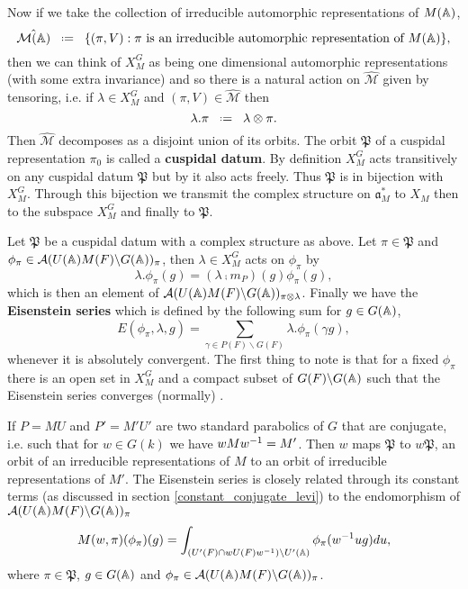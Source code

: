 Now if we take the collection of irreducible automorphic representations of \(M(\A)\),
 \[\hat{\mathcal{M}(\A)} \defeq \{(\pi, V) : \pi \text{ is an irreducible automorphic representation of }M(\A)\},\]
then we can think of \(X_M^G\) as being one dimensional automorphic representations (with some extra invariance) and so there is a natural action on \(\hat{\mathcal{M}}\) given by tensoring, i.e. if \(\lambda\in X_M^G\) and \((\pi, V)\in \hat{\mathcal{M}}\) then 
\[\lambda.\pi \defeq \lambda\tensor \pi.\]
Then \(\hat{\mathcal{M}}\) decomposes as a disjoint union of its orbits. The orbit \(\mathfrak{P}\) of a cuspidal representation \(\pi_0\) is called a \textbf{cuspidal datum}. By definition \(X_M^G\) acts transitively on any cuspidal datum \(\mathfrak{P}\) but by \cite[II.1]{moeglinSpectralDecompositionEisenstein1995} it also acts freely. Thus \(\mathfrak{P}\) is in bijection with \(X_M^G\). Through this bijection we transmit the complex structure on \(\mathfrak{a}_M^*\) to \(X_M\) then to the subspace \(X_M^G\) and finally to \(\mathfrak{P}\).

Let \(\mathfrak{P}\) be a cuspidal datum with a complex structure as above. Let \(\pi\in \mathfrak{P}\) and \(\phi_\pi \in \mathcal{A}(U(\A)M(F)\backslash G(\A))_\pi\), then \(\lambda\in X_M^G\) acts on \(\phi_\pi\) by 
\[\lambda.\phi_\pi(g) = (\lambda \comp m_P)(g) \phi_\pi(g),\]
which is then an element of \(\mathcal{A}(U(\A)M(F)\backslash G(\A))_{\pi\tensor \lambda}\). Finally we have the \textbf{Eisenstein series} which is defined by the following sum for \(g\in G(\A)\),
\[E(\phi_\pi, \lambda, g) = \sum_{\gamma \in P(F)\backslash G(F)} \lambda.\phi_\pi(\gamma g),\]
whenever it is absolutely convergent. The first thing to note is that for a fixed \(\phi_\pi\) there is an open set in \(X_M^G\) and a compact subset of \(G(F)\backslash G(\A)\) such that the Eisenstein series converges (normally) \cite[II.1.5]{moeglinSpectralDecompositionEisenstein1995}.

If \(P = MU\) and \(P' = M'U'\) are two standard parabolics of \(G\) that are conjugate, i.e. such that for \(w\in G(k)\) we have \(wMw^{-1} = M'\).
Then \(w\) maps \(\mathfrak{P}\) to \(w\mathfrak{P}\), an orbit of an irreducible representations of \(M\) to an orbit of irreducible representations of \(M'\).
The Eisenstein series is closely related through its constant terms (as discussed in section \ref{constant_conjugate_levi}) to the endomorphism of \(\mathcal{A}(U(\A)M(F)\backslash G(\A))_\pi\) 
\[M(w, \pi)(\phi_\pi)(g) = \int_{(U'(F)\cap wU(F)w\inv )\backslash U'(\A)} \phi_\pi(w\inv ug) du,\]
where \(\pi\in \mathfrak{P}\), \(g\in G(\A)\) and \(\phi_\pi \in \mathcal{A}(U(\A)M(F)\backslash G(\A))_\pi\).

